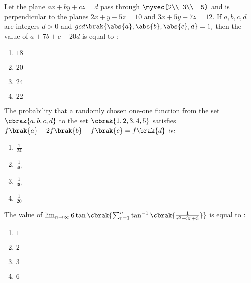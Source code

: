 
\iffalse
    \title{2020}
    \author{EE24BTECH11015}
    \section{mcq-single}
\fi
	\item Let the plane $ax + by + cz = d$ pass through $\myvec{2\\ 3\\ -5}$ and is perpendicular to the planes $2x + y - 5z = 10$ and $3x + 5y - 7z = 12.$ If $a, b, c, d$ are integers $d > 0$ and $gcd \brak{\abs{a}, \abs{b}, \abs{c}, d} = 1,$ then the value of $a + 7b + c + 20d$ is equal to :\hfill{}

\begin{multicols}{4}
\begin{enumerate}
\item $18$
\item $20$
\item $24$
\item $22$
\end{enumerate}
\end{multicols}

\item  The probability that a randomly chosen one-one function from the set $\cbrak{a, b, c, d}$ to the set $\cbrak{1, 2, 3, 4, 5}$ satisfies $f\brak{a} + 2f\brak{b} - f\brak{c} = f\brak{d}$ is: \hfill{}


\begin{multicols}{4}
\begin{enumerate}
\item $\frac{1}{24}$
\item $\frac{1}{40}$
\item $\frac{1}{30}$
\item $\frac{1}{20}$
\end{enumerate}
\end{multicols}

\item  The value of $ \lim_{n \to \infty} 6 \tan \cbrak{ \sum_{r=1}^{n} \tan^{-1} \cbrak{ \frac{1}{r^2 + 3r + 3} }}$
is equal to :\hfill{}

\begin{multicols}{4}
\begin{enumerate}
\item $1$
\item $2$
\item $3$
\item $6$
\end{enumerate}
\end{multicols}

